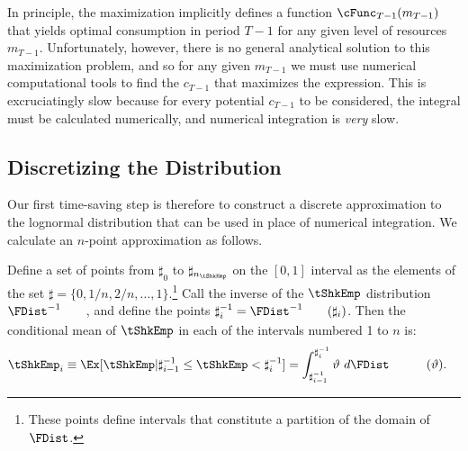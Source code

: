 \documentclass[titlepage]{\econtex}
\begin{document}
In principle, the maximization implicitly defines a function  
$\cFunc_{T-1}({m}_{T-1})$ that yields optimal consumption
in period $T-1$ for any given level of resources ${m}_{T-1}$.
Unfortunately, however, there is no general analytical solution to this
maximization problem, and so for any given ${m}_{T-1}$ we must
use numerical computational tools to find the ${c}_{T-1}$ that maximizes the
expression.  This is excruciatingly slow because for every
potential ${c}_{T-1}$ to be considered, the integral must be calculated
numerically, and numerical integration is \textit{very} slow.

\hypertarget{Discretizing-the-Distribution}{}
\subsection{Discretizing the Distribution}
Our first time-saving step is therefore to construct a discrete
approximation to the lognormal distribution that can be used in place
of numerical integration.  We calculate an $n$-point approximation as
follows.

 Define a set of points from $\sharp_{0}$ to $\sharp_{n_{\tShkEmp}}$ on the $[0,1]$ interval
as the elements of the set $\sharp = \{0,1/n,2/n, \ldots,1\}$.\footnote{These points define intervals that constitute a partition of the domain of $\FDist$.}  Call the inverse of the $\tShkEmp$ distribution $\FDist^{-1}_{\phantom{\tShkEmp}}$, and define the
points $\sharp^{-1}_{i} = \FDist^{-1}_{\phantom{\tShkEmp}}(\sharp_{i})$.  Then
the conditional mean of $\tShkEmp$ in each of the intervals numbered 1 to $n$ is:
\begin{equation}\begin{gathered}\begin{aligned}
  \tShkEmp_{i} \equiv \Ex[\tShkEmp | \sharp_{i-1}^{-1} \leq \tShkEmp < \sharp_{i}^{-1}]  & = \int_{\sharp^{-1}_{i-1}}^{\sharp^{-1}_{i}} \vartheta ~ d\FDist_{\phantom{\tShkEmp}}(\vartheta)  .
\end{aligned}\end{gathered}\end{equation}
\end{document}
